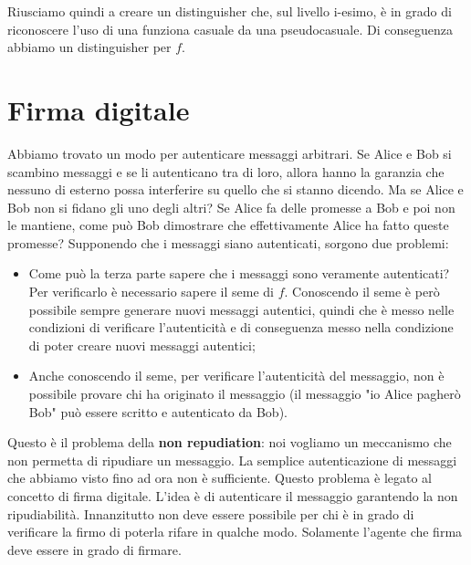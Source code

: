 \noindent Riusciamo quindi a creare un distinguisher che, sul livello i-esimo, è in grado di riconoscere l'uso di una funziona casuale da una pseudocasuale. Di conseguenza abbiamo un distinguisher per $f$.
\\

\noindent{}

\section{Firma digitale}
Abbiamo trovato un modo per autenticare messaggi arbitrari. Se Alice e Bob si scambino messaggi e se li autenticano tra di loro, allora hanno la garanzia che nessuno di esterno possa interferire su quello che si stanno dicendo. Ma se Alice e Bob non si fidano gli uno degli altri? Se Alice fa delle promesse a Bob e poi non le mantiene, come può Bob dimostrare che effettivamente Alice ha fatto queste promesse? Supponendo che i messaggi siano autenticati, sorgono due problemi:
\begin{itemize}
    \item Come può la terza parte sapere che i messaggi sono veramente autenticati? Per verificarlo è necessario sapere il seme di $f$. Conoscendo il seme è però possibile sempre generare nuovi messaggi autentici, quindi che è messo nelle condizioni di verificare l'autenticità e di conseguenza messo nella condizione di poter creare nuovi messaggi autentici;
    \item Anche conoscendo il seme, per verificare l'autenticità del messaggio, non è possibile provare chi ha originato il messaggio (il messaggio "io Alice pagherò Bob" può essere scritto e autenticato da Bob).
\end{itemize}

\noindent Questo è il problema della \textbf{non repudiation}: noi vogliamo un meccanismo che non permetta di ripudiare un messaggio. La semplice autenticazione di messaggi che abbiamo visto fino ad ora non è sufficiente. Questo problema è legato al concetto di firma digitale. L'idea è di autenticare il messaggio garantendo la non ripudiabilità. Innanzitutto non deve essere possibile per chi è in grado di verificare la firmo di poterla rifare in qualche modo. 
Solamente l'agente che firma deve essere in grado di firmare.

